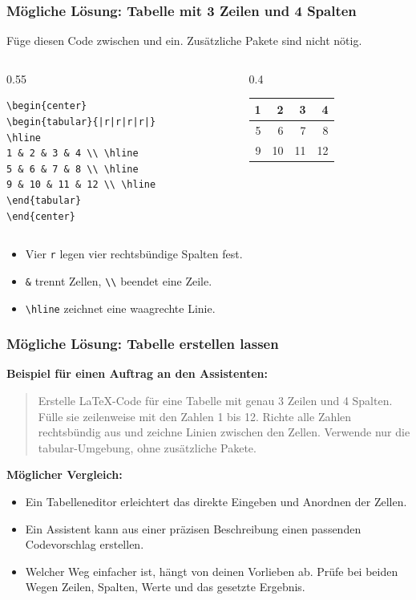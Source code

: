 \begin{frame}[fragile]
\frametitle{Mögliche Lösung: Tabelle mit 3 Zeilen und 4 Spalten}
Füge diesen Code zwischen \lstinline[style=LaTeX]|| und \lstinline[style=LaTeX]|| ein. Zusätzliche Pakete sind nicht nötig.
\begin{columns}[T]
\begin{column}{0.55\textwidth}
\begin{lstlisting}[style=LaTeX, basicstyle=\footnotesize\ttfamily]
\begin{center}
\begin{tabular}{|r|r|r|r|}
\hline
1 & 2 & 3 & 4 \\ \hline
5 & 6 & 7 & 8 \\ \hline
9 & 10 & 11 & 12 \\ \hline
\end{tabular}
\end{center}
\end{lstlisting}
\end{column}
\begin{column}{0.4\textwidth}
\centering
\begin{tabular}{|r|r|r|r|}
\hline
1 & 2 & 3 & 4 \\ \hline
5 & 6 & 7 & 8 \\ \hline
9 & 10 & 11 & 12 \\ \hline
\end{tabular}
\end{column}
\end{columns}
\begin{itemize}
    \item Vier \texttt{r} legen vier rechtsbündige Spalten fest.
    \item \lstinline[style=LaTeX]|&| trennt Zellen, \lstinline[style=LaTeX]|\\| beendet eine Zeile.
    \item \lstinline[style=LaTeX]|\hline| zeichnet eine waagrechte Linie.
\end{itemize}
\end{frame}

\begin{frame}[fragile]
\frametitle{Mögliche Lösung: Tabelle erstellen lassen}
\textbf{Beispiel für einen Auftrag an den Assistenten:}
\begin{quote}
Erstelle LaTeX-Code für eine Tabelle mit genau 3 Zeilen und 4 Spalten. Fülle sie zeilenweise mit den Zahlen 1 bis 12. Richte alle Zahlen rechtsbündig aus und zeichne Linien zwischen den Zellen. Verwende nur die tabular-Umgebung, ohne zusätzliche Pakete.
\end{quote}
\textbf{Möglicher Vergleich:}
\begin{itemize}
    \item Ein Tabelleneditor erleichtert das direkte Eingeben und Anordnen der Zellen.
    \item Ein Assistent kann aus einer präzisen Beschreibung einen passenden Codevorschlag erstellen.
    \item Welcher Weg einfacher ist, hängt von deinen Vorlieben ab. Prüfe bei beiden Wegen Zeilen, Spalten, Werte und das gesetzte Ergebnis.
\end{itemize}
\end{frame}

